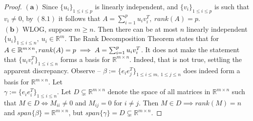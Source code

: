 \documentclass[11pt]{article}
\theoremstyle{quest}
\begin{document}
\begin{proof}
$\mathbf{(a)}$ Since $\{u_i\}_{1 \le i \le p}$ is linearly independent, and $\{v_i\}_{1 \le i \le p}$ is such that $v_i \ne 0$, by $(8.1)$ it follows that $A = \sum_{i=1}^p u_iv_i^T,\ rank(A) = p$.
\\$\mathbf{(b)}$ WLOG, suppose $m \ge n$. Then there can be at most $n$ linearly independent $\{u_i\}_{1 \le i \le n},\ u_i \in \mathbb{R}^m$. The Rank Decomposition Theorem states that for $A \in \mathbb{R}^{m \times n},\\ rank(A) = p \implies A = \sum_{i=1}^p u_iv_i^T$. It does not make the statement that $\{u_i v_i^T\}_{1 \le i \le n}$ forms a basis for $\mathbb{R}^{m \times n}$. Indeed, that is not true, settling the apparent discrepancy. Observe -- $\beta := \{e_i e_j^T\}_{1 \le i \le m,\ 1 \le j \le n}$ does indeed form a basis for $\mathbb{R}^{m \times n}$. Let
\\$\gamma := \{e_i e_i^T\}_{1 \le i \le n}$. Let $D \subsetneq \mathbb{R}^{m \times n}$ denote the space of all  matrices in $\mathbb{R}^{m \times n}$ such that $M \in D \iff M_{ii} \ne 0$ and $M_{ij} = 0$ for $i \ne j$. Then $M \in D \implies rank(M) = n$ and $span\{\beta\} = \mathbb{R}^{m \times n}$, but $span\{\gamma\} = D \subsetneq \mathbb{R}^{m \times n}$.
\end{proof}
\end{document}
